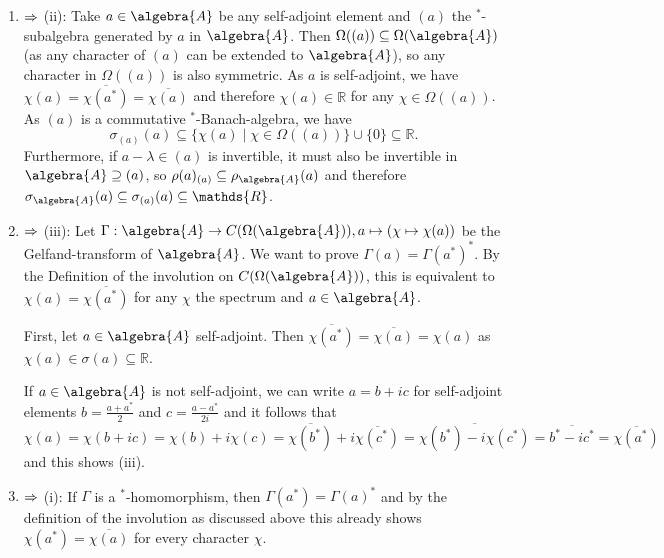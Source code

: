 \documentclass[a4paper]{article}
\begin{document}
\begin{enumerate}
    \item $\Rightarrow$ (ii): Take $a \in \algebra{A}$ be any self-adjoint element and $(a)$ the $^*$-subalgebra generated by $a$ in $\algebra{A}$.
    Then $\Omega((a)) \subseteq \Omega(\algebra{A})$ (as any character of $(a)$ can be extended to $\algebra{A}$), so any character in $\Omega((a))$ is also symmetric. As $a$ is self-adjoint, we have $\chi(a) = \overline{\chi(a^*)} = \overline{\chi(a)}$ and therefore $\chi(a) \in \mathds{R}$ for any $\chi \in \Omega((a))$.
    As $(a)$ is a commutative $^*$-Banach-algebra, we have
    \begin{equation*}
        \sigma_{(a)}(a) \subseteq \{\chi(a) \mid \chi \in \Omega((a)) \} \cup \{0\} \subseteq \mathds{R}\text{.}
    \end{equation*}
    Furthermore, if $a - \lambda \in (a)$ is invertible, it must also be invertible in $\algebra{A} \supseteq (a)$, so $\rho(a)_{(a)} \subseteq \rho_{\algebra{A}}(a)$ and therefore $\sigma_\algebra{A}(a) \subseteq \sigma_{(a)}(a) \subseteq \mathds{R}$.
    \item $\Rightarrow$ (iii): Let $\Gamma: \algebra{A} \to C(\Omega(\algebra{A})), a \mapsto (\chi \mapsto \chi(a))$ be the Gelfand-transform of $\algebra{A}$.
    We want to prove $\Gamma(a) = \Gamma(a^*)^*$.
    By the Definition of the involution on $C(\Omega(\algebra{A}))$, this is equivalent to $\chi(a) = \overline{\chi(a^*)}$ for any $\chi$ the spectrum and $a \in \algebra{A}$.

    First, let $a \in \algebra{A}$ self-adjoint.
    Then $\overline{\chi(a^*)} = \overline{\chi(a)} = \chi(a)$ as $\chi(a) \in \sigma(a) \subseteq \mathds{R}$.

    If $a \in \algebra{A}$ is not self-adjoint, we can write $a = b + ic$ for self-adjoint elements $b = \frac{a + a^*}{2}$ and $c = \frac{a - a^*}{2i}$ and it follows that
    \begin{equation*}
        \chi(a) = \chi(b + ic) = \chi(b) + i \chi(c) = \overline{\chi(b^*)} + i \overline{\chi(c^*)} = \overline{\chi(b^*) - i \chi(c^*)} = \overline{b^* - i c^*} = \overline{\chi(a^*)}
    \end{equation*}
    and this shows (iii).
    \item $\Rightarrow$ (i): If $\Gamma$ is a $^*$-homomorphism, then $\Gamma(a^*) = \Gamma(a)^*$ and by the definition of the involution as discussed above this already shows $\chi(a^*) = \overline{\chi(a)}$ for every character $\chi$.
\end{enumerate}
\end{document}
